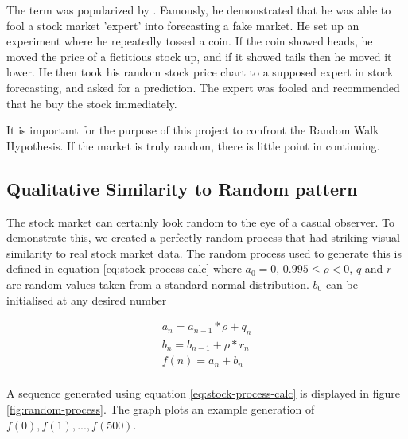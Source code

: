 \documentclass{report}
\begin{document}
The term was popularized by \citet{malkiel1999random}. Famously, he demonstrated that he was able to fool a stock market 'expert' into forecasting a fake market. He set up an experiment where he repeatedly tossed a coin. If the coin showed heads, he moved the price of a fictitious stock up, and if it showed tails then he moved it lower. He then took his random stock price chart to a supposed expert in stock forecasting, and asked for a prediction. The expert was fooled and recommended that he buy the stock immediately. 

It is important for the purpose of this project to confront the Random Walk Hypothesis. If the market is truly random, there is little point in continuing. 

\subsection{Qualitative Similarity to Random pattern}

The stock market can certainly look random to the eye of a casual observer. To demonstrate this, we created a perfectly random process that had striking visual similarity to real stock market data. The random process used to generate this is defined in equation \ref{eq:stock-process-calc} where $a_{0} = 0$, $0.995 \leq \rho < 0$, $q$ and $r$ are random values taken from a standard normal distribution. $b_{0}$ can be initialised at any desired number

\begin{equation}
  \label{eq:stock-process-calc}
  \begin{aligned}
  	a_{n} = a_{n-1} * \rho + q_{n}\\
  	b_{n} = b_{n-1} + \rho * r_{n}\\
  	f(n) = a_{n} + b_{n}\\   
  \end{aligned}
\end{equation}

A sequence generated using equation \ref{eq:stock-process-calc} is displayed in figure \ref{fig:random-process}. The graph plots an example generation of $f(0), f(1), ..., f(500)$.
\end{document}
